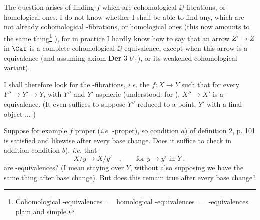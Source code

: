 

The question arises of finding $f$ which are cohomological $\DD$-fibrations, or homological ones. I do not know whether I shall be able to find any, which are not already cohomological \HOT-fibrations, or homological ones (this now amounts to the same thing\footnote[55]{Cohomological \HOT-equivalences $=$ homological \HOT-equivalences $=$ \HOT-equivalences plain and simple.} ), for in practice I hardly know how to say that an arrow $Z' \to Z$ in $\Cat$ is a complete cohomological $\DD$-equivalence, except when this arrow is a \HOT-equivalence (and assuming axiom \textbf{Der} 3 $b'_1$), or its weakened cohomological variant).

I shall therefore look for the \HOT-fibrations, \textit{i.e.} the $f : X \to Y$ such that for every $Y'' \to Y' \to Y$, with $Y''$ and $Y'$ aspheric (understood: for \HOT), $X'' \to X'$ is a \Hot-equivalence. (It even suffices to suppose $Y''$ reduced to a point, $Y'$ with a final object $\ldots$ )

Suppose for example $f$ proper (\textit{i.e.} \HOT-proper), so condition $a$) of definition 2, p. 101 is satisfied and likewise after every base change. Does it suffice to check in addition condition $b$), \textit{i.e.} that
\[ X/y \longrightarrow X/y' \quad , \qquad \text{for } y \to y' \text{ in } Y \ , \]
are \Hot-equivalences? (I mean staying over $Y$, without also supposing we have the same thing after base change).
But does this remain true after every base change? %

